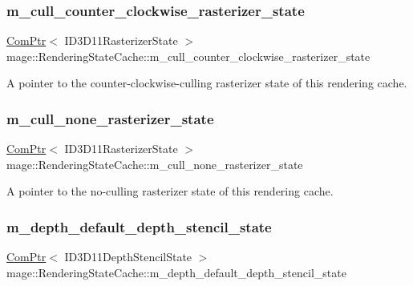 \subsubsection{\texorpdfstring{m\+\_\+cull\+\_\+counter\+\_\+clockwise\+\_\+rasterizer\+\_\+state}{m\_cull\_counter\_clockwise\_rasterizer\_state}}
{\footnotesize\ttfamily \hyperlink{namespacemage_ae74f374780900893caa5555d1031fd79}{Com\+Ptr}$<$ I\+D3\+D11\+Rasterizer\+State $>$ mage\+::\+Rendering\+State\+Cache\+::m\+\_\+cull\+\_\+counter\+\_\+clockwise\+\_\+rasterizer\+\_\+state\hspace{0.3cm}{\ttfamily [private]}}

A pointer to the counter-\/clockwise-\/culling rasterizer state of this rendering cache. \hypertarget{structmage_1_1_rendering_state_cache_a3801dbdf6386c9534123d695cbde47c7}{}\label{structmage_1_1_rendering_state_cache_a3801dbdf6386c9534123d695cbde47c7} 
\subsubsection{\texorpdfstring{m\+\_\+cull\+\_\+none\+\_\+rasterizer\+\_\+state}{m\_cull\_none\_rasterizer\_state}}
{\footnotesize\ttfamily \hyperlink{namespacemage_ae74f374780900893caa5555d1031fd79}{Com\+Ptr}$<$ I\+D3\+D11\+Rasterizer\+State $>$ mage\+::\+Rendering\+State\+Cache\+::m\+\_\+cull\+\_\+none\+\_\+rasterizer\+\_\+state\hspace{0.3cm}{\ttfamily [private]}}

A pointer to the no-\/culling rasterizer state of this rendering cache. \hypertarget{structmage_1_1_rendering_state_cache_ad7f220ca4bc92d814e3e9044b0edf7e2}{}\label{structmage_1_1_rendering_state_cache_ad7f220ca4bc92d814e3e9044b0edf7e2} 
\subsubsection{\texorpdfstring{m\+\_\+depth\+\_\+default\+\_\+depth\+\_\+stencil\+\_\+state}{m\_depth\_default\_depth\_stencil\_state}}
{\footnotesize\ttfamily \hyperlink{namespacemage_ae74f374780900893caa5555d1031fd79}{Com\+Ptr}$<$ I\+D3\+D11\+Depth\+Stencil\+State $>$ mage\+::\+Rendering\+State\+Cache\+::m\+\_\+depth\+\_\+default\+\_\+depth\+\_\+stencil\+\_\+state\hspace{0.3cm}{\ttfamily [private]}}

